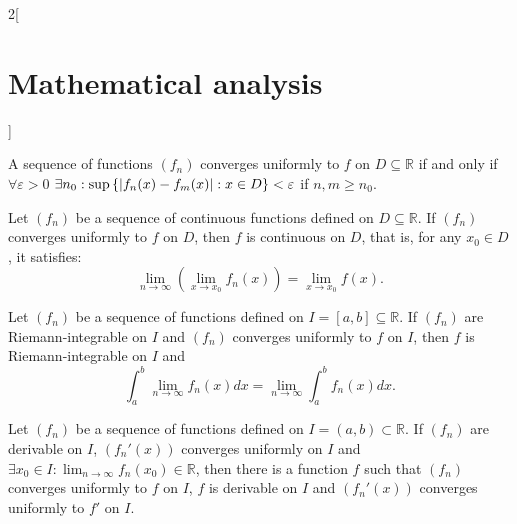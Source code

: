 \documentclass[../../../main.tex]{subfiles}
\begin{document}
\begin{multicols}{2}[\section{Mathematical analysis}]
\begin{theorem}
A sequence of functions $(f_n)$ converges uniformly to $f$ on $D\subseteq\mathbb{R}$ if and only if $\forall\varepsilon>0$ $\displaystyle\exists n_0:\sup\left\{|f_n(x)-f_m(x)|:\\ x\in D\right\}< \varepsilon$ if $n,m\geq n_0$.
\end{theorem}
\begin{theorem}
Let $(f_n)$ be a sequence of continuous functions defined on $D\subseteq\mathbb{R}$. If $(f_n)$ converges uniformly to $f$ on $D$, then $f$ is continuous on $D$, that is, for any $x_0\in D$, it satisfies: $$\lim_{n\to\infty}\left(\lim_{x\to x_0} f_n(x)\right)=\lim_{x\to x_0} f(x).$$
\end{theorem}
\begin{theorem}
Let $(f_n)$ be a sequence of functions defined on  $I=[a,b]\subseteq\mathbb{R}$. If $(f_n)$ are Riemann-integrable on $I$ and $(f_n)$ converges uniformly to $f$ on $I$, then $f$ is Riemann-integrable on $I$ and $$\int_a^b\lim_{n\to\infty} f_n(x) dx=\lim_{n\to\infty} \int_a^bf_n(x) dx.$$
\end{theorem}
\begin{theorem}
Let $(f_n)$ be a sequence of functions defined on $I=(a,b)\subset\mathbb{R}$. If $(f_n)$ are derivable on $I$, $(f_n'(x))$ converges uniformly on $I$ and $\displaystyle\exists x_0\in I: \lim_{n\to\infty}f_n(x_0)\in\mathbb{R}$, then there is a function $f$ such that $(f_n)$ converges uniformly to $f$ on $I$, $f$ is derivable on $I$ and $(f_n'(x))$ converges uniformly to $f'$ on $I$.
\end{theorem}

\end{multicols}
\end{document}
